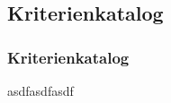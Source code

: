 \subsection{Kriterienkatalog}

\begin{frame}
\frametitle{Kriterienkatalog}

asdfasdfasdf

\end{frame}
